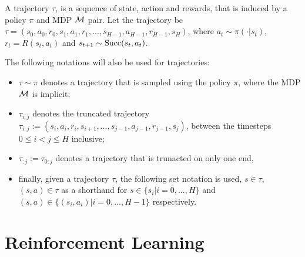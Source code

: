     \begin{defn}
        \label{def:trajectory}
        A \textnormal{trajectory} $\tau$, is a sequence of state, action and rewards, that is induced by a policy $\pi$ and MDP $\mathcal{M}$ pair. Let the trajectory be $\tau = (s_0, a_0, r_0, s_1, a_1, r_1, ..., s_{H-1}, a_{H-1}, r_{H-1}, s_H)$, where $a_t \sim \pi(\cdot|s_t)$, $r_t=R(s_t,a_t)$ and $s_{t+1} \sim {\textnormal{Succ}(s_t,a_t)}$. 
        
        The following notations will also be used for trajectories:
        \begin{itemize}
            \item $\tau\sim\pi$ denotes a trajectory that is sampled using the policy $\pi$, where the MDP $\mathcal{M}$ is implicit;
            \item $\tau_{i:j}$ denotes the \textnormal{truncated trajectory} $\tau_{i:j}:=(s_i, a_i, r_i, s_{i+1}, ..., s_{j-1}, a_{j-1}, r_{j-1}, s_j)$, between the timesteps $0\leq i < j \leq H$ inclusive;
            \item $\tau_{:j}:=\tau_{0:j}$ denotes a trajectory that is trunacted on only one end,
            \item finally, given a trajectory $\tau$, the following set notation is used, $s\in \tau$, $(s,a)\in\tau$ as a shorthand for $s\in\{s_i|i=0,...,H\}$ and $(s,a)\in\{(s_i,a_i)|i=0,...,H-1\}$ respectively. 
        \end{itemize}
    \end{defn}









\section{Reinforcement Learning}
\label{sec:2-2-rl}


